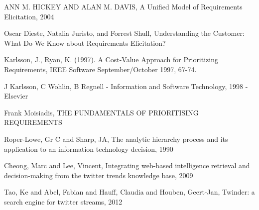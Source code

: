 \begin{thebibliography}{99}

 ANN M. HICKEY AND ALAN M. DAVIS, A Unified Model of Requirements Elicitation, 2004

Oscar Dieste, Natalia Juristo, and Forrest Shull, Understanding the Customer: What Do We Know about Requirements Elicitation?

Karlsson, J., Ryan, K. (1997). A Cost-Value Approach for Prioritizing Requirements, IEEE Software September/October 1997, 67-74.

J Karlsson, C Wohlin, B Regnell - Information and Software Technology, 1998 - Elsevier

Frank Moisiadis, THE FUNDAMENTALS OF PRIORITISING REQUIREMENTS

 Roper-Lowe, Gr C and Sharp, JA, The analytic hierarchy process and its application to an information technology decision, 1990

 Cheong, Marc and Lee, Vincent, Integrating web-based intelligence retrieval and decision-making from the twitter trends knowledge base, 2009

 Tao, Ke and Abel, Fabian and Hauff, Claudia and Houben, Geert-Jan, Twinder: a search engine for twitter streams, 2012

\end{thebibliography}